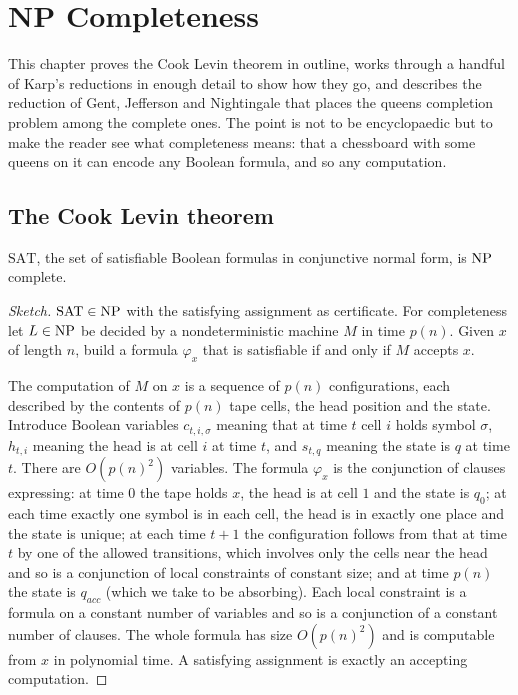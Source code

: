 \chapter{NP Completeness}
\label{ch:npcomplete}

This chapter proves the Cook Levin theorem in outline, works through a handful of Karp's reductions in enough detail to show how they go, and describes the reduction of Gent, Jefferson and Nightingale that places the queens completion problem among the complete ones. The point is not to be encyclopaedic but to make the reader see what completeness means: that a chessboard with some queens on it can encode any Boolean formula, and so any computation.

\section{The Cook Levin theorem}

\begin{theorem}
$\mathrm{SAT}$, the set of satisfiable Boolean formulas in conjunctive normal form, is $\mathrm{NP}$ complete.
\end{theorem}

\begin{proof}[Sketch]
$\mathrm{SAT} \in \mathrm{NP}$ with the satisfying assignment as certificate. For completeness let $L \in \mathrm{NP}$ be decided by a nondeterministic machine $M$ in time $p(n)$. Given $x$ of length $n$, build a formula $\varphi_x$ that is satisfiable if and only if $M$ accepts $x$.

The computation of $M$ on $x$ is a sequence of $p(n)$ configurations, each described by the contents of $p(n)$ tape cells, the head position and the state. Introduce Boolean variables $c_{t, i, \sigma}$ meaning that at time $t$ cell $i$ holds symbol $\sigma$, $h_{t, i}$ meaning the head is at cell $i$ at time $t$, and $s_{t, q}$ meaning the state is $q$ at time $t$. There are $O(p(n)^2)$ variables. The formula $\varphi_x$ is the conjunction of clauses expressing: at time $0$ the tape holds $x$, the head is at cell $1$ and the state is $q_0$; at each time exactly one symbol is in each cell, the head is in exactly one place and the state is unique; at each time $t+1$ the configuration follows from that at time $t$ by one of the allowed transitions, which involves only the cells near the head and so is a conjunction of local constraints of constant size; and at time $p(n)$ the state is $q_{acc}$ (which we take to be absorbing). Each local constraint is a formula on a constant number of variables and so is a conjunction of a constant number of clauses. The whole formula has size $O(p(n)^2)$ and is computable from $x$ in polynomial time. A satisfying assignment is exactly an accepting computation.
\end{proof}

